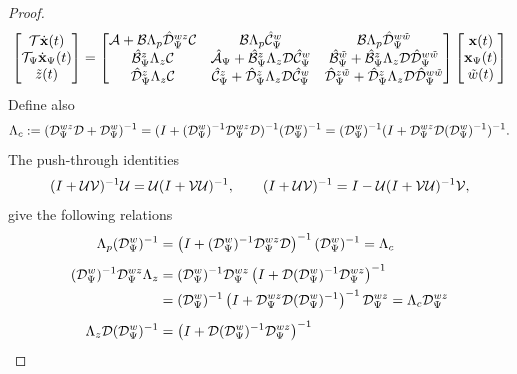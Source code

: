 \begin{proof}
\begin{equation}
    \begin{bmatrix}\mathcal{T}\dot{\mathbf{x}}(t) \\ \mathcal{T}_\Psi\dot{\mathbf{x}}_\Psi(t)\\ \tilde{z}(t)\end{bmatrix} = 
    \begin{bmatrix}\mathcal{A} + \mathcal{B}\Lambda_p\hat{\mathcal{D}}_\Psi^{wz}\mathcal{C} & \mathcal{B}\Lambda_p\hat{\mathcal{C}}_\Psi^w & \mathcal{B}\Lambda_p\hat{\mathcal{D}}_\Psi^{w\tilde{w}} \\
    \hat{\mathcal{B}}_\Psi^z\Lambda_z\mathcal{C} & \hat{\mathcal{A}}_\Psi + \hat{\mathcal{B}}_\Psi^z\Lambda_z\mathcal{D}\hat{\mathcal{C}}_\Psi^w & \hat{\mathcal{B}}_\Psi^{\tilde{w}} + \hat{\mathcal{B}}_\Psi^z\Lambda_z\mathcal{D}\hat{\mathcal{D}}_\Psi^{w\tilde{w}} \\
    \hat{\mathcal{D}}_\Psi^z\Lambda_z\mathcal{C} & \hat{\mathcal{C}}_\Psi^z + \hat{\mathcal{D}}_\Psi^z\Lambda_z\mathcal{D}\hat{\mathcal{C}}_\Psi^w & \hat{\mathcal{D}}_\Psi^{z\tilde{w}} + \hat{\mathcal{D}}_\Psi^z\Lambda_z\mathcal{D}\hat{\mathcal{D}}_\Psi^{w\tilde{w}}\end{bmatrix}\begin{bmatrix}\mathbf{x}(t) \\ \mathbf{x}_\Psi(t) \\ \tilde{w}(t)\end{bmatrix}
    \end{equation}
Define also
\begin{equation*}
    \Lambda_c := (\mathcal{D}_\Psi^{wz} \mathcal{D} + \mathcal{D}_\Psi^w)^{-1} = 
    (I+(\mathcal{D}_\Psi^w)^{-1}\mathcal{D}_\Psi^{wz} \mathcal{D})^{-1}(\mathcal{D}_\Psi^w)^{-1} = 
    (\mathcal{D}_\Psi^w)^{-1} (I+\mathcal{D}_\Psi^{wz}\mathcal{D}(\mathcal{D}_\Psi^w)^{-1})^{-1}.
\end{equation*}
The push-through identities
\begin{equation*}
    (I+\mathcal{U}\mathcal{V})^{-1}\mathcal{U}
        = \mathcal{U}(I+\mathcal{V}\mathcal{U})^{-1}, \qquad
    (I+\mathcal{U}\mathcal{V})^{-1}
        = I-\mathcal{U}(I+\mathcal{V}\mathcal{U})^{-1}\mathcal{V},
\end{equation*}
give the following relations
\begin{align}
    \Lambda_p(\mcl{D}_\Psi^w)^{-1}
        &= \left(I+(\mcl{D}_\Psi^w)^{-1}\mcl{D}_\Psi^{wz}\mcl{D}\right)^{-1}
           (\mcl{D}_\Psi^w)^{-1} = \Lambda_c
           \label{eqn:id1}\\[4pt]
    (\mcl{D}_\Psi^w)^{-1}\mcl{D}_\Psi^{wz}\Lambda_z
        &= (\mcl{D}_\Psi^w)^{-1}\mcl{D}_\Psi^{wz}
           \left(I+\mcl{D}(\mcl{D}_\Psi^w)^{-1}\mcl{D}_\Psi^{wz}\right)^{-1}
           \notag\\
        &= (\mcl{D}_\Psi^w)^{-1}
           \left(I+\mcl{D}_\Psi^{wz}\mcl{D}(\mcl{D}_\Psi^w)^{-1}\right)^{-1}
           \mcl{D}_\Psi^{wz}
         = \Lambda_c\mcl{D}_\Psi^{wz}
           \label{eqn:id2}\\[4pt]
    \Lambda_z\mcl{D}(\mcl{D}_\Psi^w)^{-1}
        &= \left(I+\mcl{D}(\mcl{D}_\Psi^w)^{-1}\mcl{D}_\Psi^{wz}\right)^{-1}

\end{align}
\end{proof}
